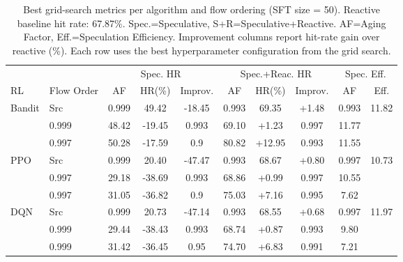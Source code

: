 \begin{table}[t]
\centering
\caption{Best grid-search metrics per algorithm and flow ordering (SFT size = 50). Reactive baseline hit rate: 67.87\%. Spec.=Speculative, S+R=Speculative+Reactive. AF=Aging Factor, Eff.=Speculation Efficiency. Improvement columns report hit-rate gain over reactive (\%). Each row uses the best hyperparameter configuration from the grid search.}
\label{tab:unified-grid-metrics-tablesize50}
\small
\begin{tabular}{@{}llcccccccc@{}}
\toprule
& & \multicolumn{3}{c}{Spec. HR} & \multicolumn{3}{c}{Spec.+Reac. HR} & \multicolumn{2}{c}{Spec. Eff.} \\
\cmidrule(lr){3-5} \cmidrule(lr){6-8} \cmidrule(lr){9-10}
RL & Flow Order & AF & HR(\%) & Improv. & AF & HR(\%) & Improv. & AF & Eff. \\
\midrule
\multirow{3}{*}{Bandit} & Src & 0.999 & 49.42 & -18.45 & 0.993 & 69.35 & +1.48 & 0.993 & 11.82 \\
Dest & 0.999 & 48.42 & -19.45 & 0.993 & 69.10 & +1.23 & 0.997 & 11.77 \\
Trace & 0.997 & 50.28 & -17.59 & 0.9 & 80.82 & +12.95 & 0.993 & 11.55 \\
\multirow{3}{*}{PPO} & Src & 0.999 & 20.40 & -47.47 & 0.993 & 68.67 & +0.80 & 0.997 & 10.73 \\
Dest & 0.997 & 29.18 & -38.69 & 0.993 & 68.86 & +0.99 & 0.997 & 10.55 \\
Trace & 0.997 & 31.05 & -36.82 & 0.9 & 75.03 & +7.16 & 0.995 & 7.62 \\
\multirow{3}{*}{DQN} & Src & 0.999 & 20.73 & -47.14 & 0.993 & 68.55 & +0.68 & 0.997 & 11.97 \\
Dest & 0.999 & 29.44 & -38.43 & 0.993 & 68.74 & +0.87 & 0.993 & 9.80 \\
Trace & 0.999 & 31.42 & -36.45 & 0.95 & 74.70 & +6.83 & 0.991 & 7.21 \\
\bottomrule
\end{tabular}
\end{table}
